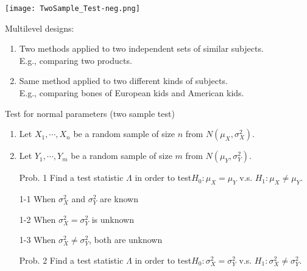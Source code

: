\begin{frame}
\begin{center}
\texttt{[image: TwoSample\_Test-neg.png]}\\
\end{center}
\pause
Multilevel designs:\\[1em]

\begin{enumerate}
\item Two methods applied to two independent sets of similar subjects.\\[1em]
E.g., comparing two products.
\vfill
\item Same method applied to two different kinds of subjects. \\[1em]
E.g., comparing bones of European kids and American kids.
\end{enumerate}
\end{frame}
\begin{frame}{Test for normal parameters (two sample test)}
\begin{enumerate}
\item Let $X_1,\cdots, X_n$ be a random sample of size $n$ from $N(\mu_X,\sigma^2_X)$.	\\[1em]
\item Let $Y_1,\cdots, Y_m$ be a random sample of size $m$ from $N(\mu_Y,\sigma^2_Y)$.
\vfill
\item[Prob. 1] Find a test statistic $\Lambda$ in order to test\hfill $H_0 : \mu_X = \mu_Y$ v.s. $H_1 : \mu_X \ne \mu_Y$. \\[2em]
\item[1-1]When $\sigma^2_X$ and $\sigma^2_Y$ are known\\[1em]
\item[1-2]When $\sigma^2_X = \sigma^2_Y$ is unknown\\[1em]
\item[1-3]When $\sigma^2_X \ne \sigma^2_Y$, both are unknown
\pause \hspace{3em}
\vfill
\item[Prob. 2] Find a test statistic $\Lambda$ in order to test\hfill $H_0 : \sigma_X^2 = \sigma_Y^2$ v.s. $H_1 : \sigma_X^2 \ne \sigma^2_Y$. \\[2em]
\end{enumerate}
\end{frame}

